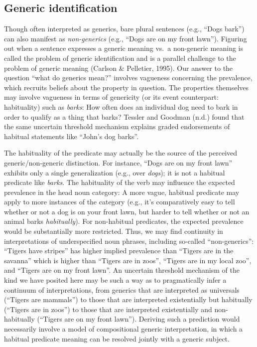 \documentclass[,man,floatsintext]{apa6}
\theoremstyle{definition}
\theoremstyle{definition}
\theoremstyle{definition}
\theoremstyle{remark}
\begin{document}
\hypertarget{generic-identification}{%
\subsection{Generic identification}\label{generic-identification}}

Though often interpreted as generics, bare plural sentences (e.g.,
\enquote{Dogs bark}) can also manifest as \emph{non-generics} (e.g.,
\enquote{Dogs are on my front lawn}). Figuring out when a sentence
expresses a generic meaning vs.~a non-generic meaning is called the
problem of generic identification and is a parallel challenge to the
problem of generic meaning (Carlson \& Pelletier, 1995). Our answer to
the question \enquote{what do generics mean?} involves vagueness
concerning the prevalence, which recruits beliefs about the property in
question. The properties themselves may involve vagueness in terms of
genericity (or its event counterpart: habituality) such as \emph{barks}:
How often does an individual dog need to bark in order to qualify as a
thing that barks? Tessler and Goodman (n.d.) found that the same
uncertain threshold mechanism explains graded endorsements of habitual
statements like \enquote{John's dog barks}.

The habituality of the predicate may actually be the source of the
perceived generic/non-generic distinction. For instance, \enquote{Dogs
are on my front lawn} exhibits only a single generalization (e.g., over
\emph{dogs}); it is not a habitual predicate like \emph{barks}. The
habituality of the verb may influence the expected prevalence in the
head noun category: A more vague, habitual predicate may apply to more
instances of the category (e.g., it's comparatively easy to tell whether
or not a dog is on your front lawn, but harder to tell whether or not an
animal barks \emph{habitually}). For non-habitual predicates, the
expected prevalence would be substantially more restricted. Thus, we may
find continuity in interpretations of underspecified noun phrases,
including so-called \enquote{non-generics}: \enquote{Tigers have
stripes} has higher implied prevalence than \enquote{Tigers are in the
savanna} which is higher than \enquote{Tigers are in zoos},
\enquote{Tigers are in my local zoo}, and \enquote{Tigers are on my
front lawn}. An uncertain threshold mechanism of the kind we have
posited here may be such a way as to pragmatically infer a continuum of
interpretations, from generics that are interpreted as universals
(\enquote{Tigers are mammals}) to those that are interpreted
existentially but habitually (\enquote{Tigers are in zoos}) to those
that are interpreted existentially and non-habitually (\enquote{Tigers
are on my front lawn}). Deriving such a prediction would necessarily
involve a model of compositional generic interpretation, in which a
habitual predicate meaning can be resolved jointly with a generic
subject.
\end{document}
